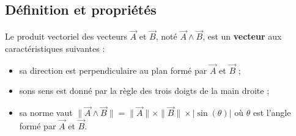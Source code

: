 \subsection{Définition et propriétés} %
Le produit vectoriel des vecteurs $\overrightarrow{A}$ et $\overrightarrow{B}$, noté $\overrightarrow{A}\wedge\overrightarrow{B}$, est un \textbf{vecteur} aux caractéristiques suivantes : 
\begin{itemize}
	\item sa direction est perpendiculaire au plan formé par $\overrightarrow{A}$ et $\overrightarrow{B}$ ;
	\item sons sens est donné par la règle des trois doigts de la main droite ;
	\item sa norme vaut $\|\overrightarrow{A}\wedge\overrightarrow{B}\|=\|\overrightarrow{A}\|\times \|\overrightarrow{B}\|\times|\sin(\theta)|$ où $\theta$ est l'angle formé par $\overrightarrow{A}$ et $\overrightarrow{B}$.
\end{itemize}
